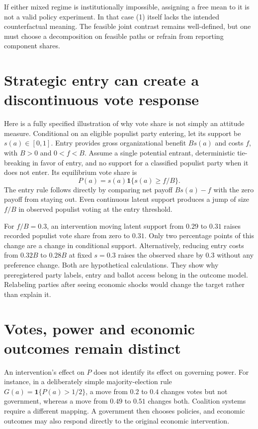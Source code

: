 \documentclass[11pt,a4paper]{article}
\newcommand{\ind}{\mathbf1}
\begin{document}
If either mixed regime is institutionally impossible, assigning a free mean to it is not a valid policy experiment. In that case (1) itself lacks the intended counterfactual meaning. The feasible joint contrast remains well-defined, but one must choose a decomposition on feasible paths or refrain from reporting component shares.

\section{Strategic entry can create a discontinuous vote response}
Here is a fully specified illustration of why vote share is not simply an attitude measure. Conditional on an eligible populist party entering, let its support be $s(a)\in[0,1]$. Entry provides gross organizational benefit $B s(a)$ and costs $f$, with $B>0$ and $0<f<B$. Assume a single potential entrant, deterministic tie-breaking in favor of entry, and no support for a classified populist party when it does not enter. Its equilibrium vote share is
\[
 P(a)=s(a)\ind\{s(a)\ge f/B\}.                      \tag{5}
\]
The entry rule follows directly by comparing net payoff $Bs(a)-f$ with the zero payoff from staying out. Even continuous latent support produces a jump of size $f/B$ in observed populist voting at the entry threshold.

For $f/B=0.3$, an intervention moving latent support from $0.29$ to $0.31$ raises recorded populist vote share from zero to $0.31$. Only two percentage points of this change are a change in conditional support. Alternatively, reducing entry costs from $0.32B$ to $0.28B$ at fixed $s=0.3$ raises the observed share by $0.3$ without any preference change. Both are hypothetical calculations. They show why preregistered party labels, entry and ballot access belong in the outcome model. Relabeling parties after seeing economic shocks would change the target rather than explain it.

\section{Votes, power and economic outcomes remain distinct}
An intervention's effect on $P$ does not identify its effect on governing power. For instance, in a deliberately simple majority-election rule $G(a)=\ind\{P(a)>1/2\}$, a move from $0.2$ to $0.4$ changes votes but not government, whereas a move from $0.49$ to $0.51$ changes both. Coalition systems require a different mapping. A government then chooses policies, and economic outcomes may also respond directly to the original economic intervention.
\end{document}
